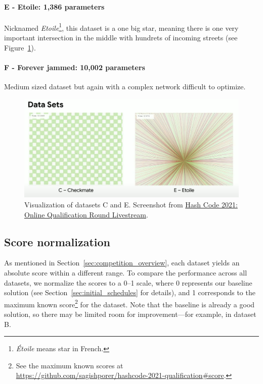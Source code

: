 \paragraph{E - Etoile: 1,386 parameters} Nicknamed \textit{Etoile}\footnote{\textit{Étoile} means star in French.}, this dataset is a one big star, meaning there is one very important intersection in the middle with hundrets of incoming streets (see Figure~\ref{fig:hashcode_dataset_c_e}).

\paragraph{F - Forever jammed: 10,002 parameters} Medium sized dataset but again with a complex network difficult to optimize.

\begin{figure}[h]
    \centering
    \includegraphics[width=\linewidth]{img/screenshots/hashcode_datasets_c_e.png}
    \caption[Visualization of datasets C and E]{
        Visualization of datasets C and E. Screenshot from \href{https://www.youtube.com/watch?v=YPOVd-hQUjA}{Hash Code 2021: Online Qualification Round Livestream}.
    }
    \label{fig:hashcode_dataset_c_e}
    \end{figure}

\subsection{Score normalization} \label{subsec:score_normalization}

As mentioned in Section~\ref{sec:competition_overview}, each dataset yields an absolute score within a different range. To compare the performance across all datasets, we normalize the scores to a 0--1 scale, where 0 represents our baseline solution (see Section~\ref{sec:initial_schedules} for details), and 1 corresponds to the maximum known score\footnote{See the maximum known scores at \\\url{https://github.com/sagishporer/hashcode-2021-qualification\#score}.} for the dataset. Note that the baseline is already a good solution, so there may be limited room for improvement---for example, in dataset B.

